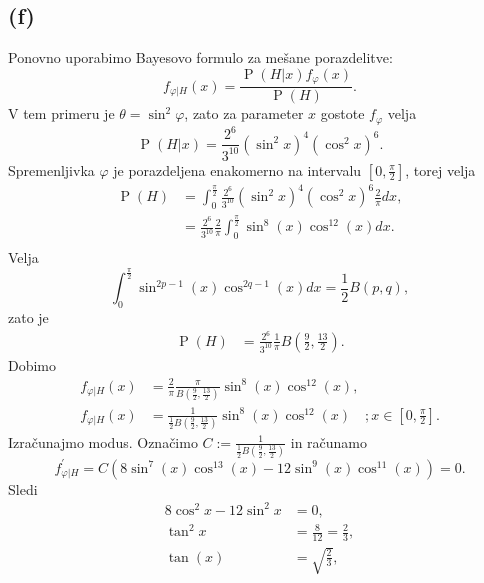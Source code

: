 \documentclass{article}
\DeclareMathOperator{\verjetnost}{P}
\begin{document}
\subsection*{(f)}
Ponovno uporabimo Bayesovo formulo za mešane porazdelitve:
\begin{equation*}
    f_{\varphi |H}(x) = \frac{\verjetnost(H | x) f_\varphi (x)}{\verjetnost(H)}.
\end{equation*}
V tem primeru je $\theta = \sin^2 \varphi$, zato za parameter $x$ gostote $f_\varphi$ velja
\begin{equation*}
    \verjetnost(H | x) = \frac{2^6}{3^{10}}(\sin^2 x)^4 (\cos^2 x)^6.
\end{equation*}
Spremenljivka $\varphi$ je porazdeljena enakomerno na intervalu $[0, \frac{\pi}{2}]$, torej velja
\begin{align*}
    \verjetnost(H) &= \int_0^{\frac{\pi}{2}} \frac{2^6}{3^{10}}(\sin^2 x)^4 (\cos^2 x)^6 \frac{2}{\pi} dx, \\
    &= \frac{2^6}{3^{10}} \frac{2}{\pi} \int_0^{\frac{\pi}{2}} \sin^8 (x) \cos^{12} (x) dx. \\
\end{align*}
Velja
\begin{equation*}
    \int_0^{\frac{\pi}{2}} \sin^{2p-1} (x) \cos^{2q-1}(x) dx = \frac{1}{2} B(p, q),
\end{equation*}
zato je
\begin{align*}
    \verjetnost(H) &= \frac{2^6}{3^{10}} \frac{1}{\pi} B \left(\frac{9}{2}, \frac{13}{2} \right).
\end{align*}
Dobimo
\begin{align*}
    f_{\varphi | H}(x) &= \frac{2}{\pi} \frac{\pi}{B \left(\frac{9}{2}, \frac{13}{2} \right)} \sin^8(x) \cos^{12}(x), \\
    f_{\varphi | H}(x) &= \frac{1}{\frac{1}{2} B \left(\frac{9}{2}, \frac{13}{2} \right)} \sin^8(x) \cos^{12}(x) \quad ; x \in \left[0, \frac{\pi}{2} \right].
\end{align*}
Izračunajmo modus. Označimo $C := \frac{1}{\frac{1}{2} B \left(\frac{9}{2}, \frac{13}{2} \right)}$ in računamo
\begin{equation*}
    f_{\varphi | H}^\prime = C \left(8 \sin^7(x)\cos^{13}(x) - 12 \sin^9(x) \cos^{11}(x)\right) = 0.
\end{equation*}
Sledi
\begin{align*}
    8 \cos^2 x - 12 \sin^2 x &= 0, \\
    \tan^2 x &= \frac{8}{12} = \frac{2}{3}, \\
    \tan(x) &= \sqrt{\frac{2}{3}},
\end{align*}
\end{document}
